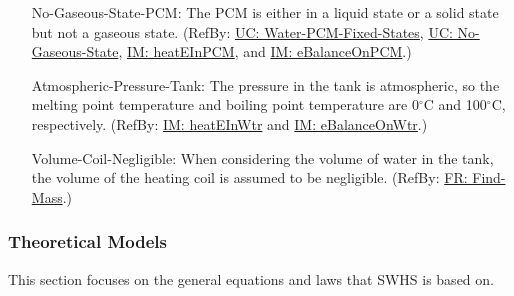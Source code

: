 \documentclass[12pt]{article}
\begin{document}
\begin{itemize}
\item[No-Gaseous-State-PCM:\phantomsection\label{assumpNGSP}]{The PCM is either in a liquid state or a solid state but not a gaseous state. (RefBy: \hyperref[unlikeChgWPFS]{UC: Water-PCM-Fixed-States}, \hyperref[unlikeChgNGS]{UC: No-Gaseous-State}, \hyperref[IM:heatEInPCM]{IM: heatEInPCM}, and \hyperref[IM:eBalanceOnPCM]{IM: eBalanceOnPCM}.)}
\item[Atmospheric-Pressure-Tank:\phantomsection\label{assumpAPT}]{The pressure in the tank is atmospheric, so the melting point temperature and boiling point temperature are 0${}^{\circ}$C and 100${}^{\circ}$C, respectively. (RefBy: \hyperref[IM:heatEInWtr]{IM: heatEInWtr} and \hyperref[IM:eBalanceOnWtr]{IM: eBalanceOnWtr}.)}
\item[Volume-Coil-Negligible:\phantomsection\label{assumpVCN}]{When considering the volume of water in the tank, the volume of the heating coil is assumed to be negligible. (RefBy: \hyperref[findMass]{FR: Find-Mass}.)}
\end{itemize}
\subsubsection{Theoretical Models}
\label{Sec:TMs}
This section focuses on the general equations and laws that SWHS is based on.
\end{document}
